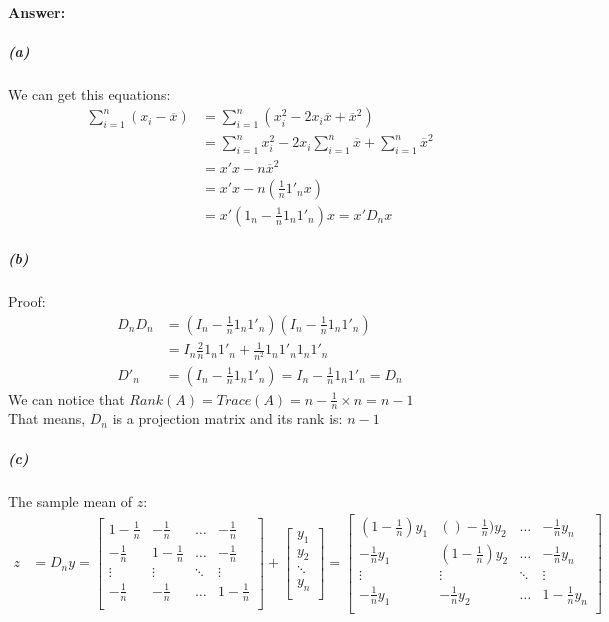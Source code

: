\documentclass[11pt]{article}
\begin{document}
\paragraph{Answer:}
  \subparagraph{(a)}
    We can get this equations: \\
    \begin{align*}
      \sum^n_{i=1}(x_i - \overline{x}) &= \sum^n_{i=1}(x_i^2 - 2x_i \overline{x} + \overline{x}^2) \\
      & = \sum^n_{i=1}x_i^2 - 2x_i\sum^n_{i=1}\overline{x} + \sum^n_{i=1} \overline{x}^2 \\
      & = x'x - n\overline{x}^2 \\
      & = x'x - n(\frac{1}{n}1'_nx) \\
      & = x'(1_n -\frac{1}{n}1_n1'_n)x = x'D_nx
    \end{align*}
  \subparagraph{(b)}
  Proof: \\
    \begin{align*}
      D_nD_n &= (I_n -\frac{1}{n}1_n 1'_n)(I_n -\frac{1}{n}1_n 1'_n) \\
             &= I_n \frac{2}{n}1_n1'_n +\frac{1}{n^2}1_n1'_n1_n1'_n \\
      D'_n   &= (I_n - \frac{1}{n}1_n1'_n) = I_n - \frac{1}{n}1_n1'_n = D_n
    \end{align*}
  We can notice that $Rank(A) = Trace(A) = n - \frac{1}{n} \times n = n - 1$ \\
  That means, $D_n$ is a projection matrix and its rank is: $n - 1$
  \subparagraph{(c)}
    The sample mean of $z$:
    \begin{align*}
      z &= D_ny =
      \begin{bmatrix}
        1-\frac{1}{n} & -\frac{1}{n} & \dots &-\frac{1}{n} \\
        -\frac{1}{n} & 1-\frac{1}{n} & \dots & -\frac{1}{n} \\
        \vdots & \vdots & \ddots & \vdots \\
        -\frac{1}{n} & -\frac{1}{n} &\dots & 1-\frac{1}{n} \\
      \end{bmatrix}
       +
      \begin{bmatrix}
        y_1 \\
        y_2 \\
        \ddots \\
        y_n \\
      \end{bmatrix} =
      \begin{bmatrix}
        (1-\frac{1}{n})y_1 & ()-\frac{1}{n})y_2 & \dots & -\frac{1}{n}y_n \\
        -\frac{1}{n}y_1 & (1-\frac{1}{n})y_2 & \dots & -\frac{1}{n}y_n  \\
        \vdots & \vdots & \ddots & \vdots \\
        -\frac{1}{n}y_1 & -\frac{1}{n}y_2 &\dots & 1-\frac{1}{n}y_n  \\
      \end{bmatrix}
    \end{align*}
\end{document}

